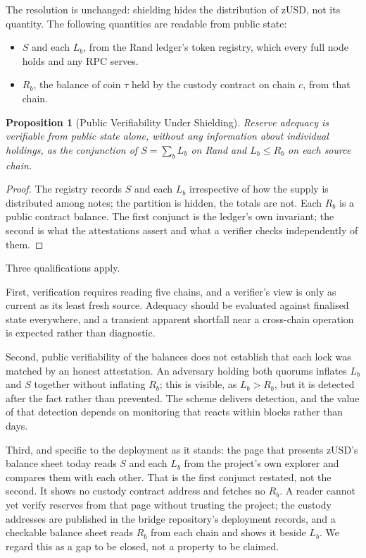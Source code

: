 \documentclass[11pt,a4paper]{article}
\newtheorem{proposition}[theorem]{Proposition}
\begin{document}
The resolution is unchanged: shielding hides the distribution of zUSD, not its quantity. The following quantities are readable from public state:

\begin{itemize}
    \item $S$ and each $L_b$, from the Rand ledger's token registry, which every full node holds and any RPC serves.
    \item $R_b$, the balance of coin $\tau$ held by the custody contract on chain $c$, from that chain.
\end{itemize}

\begin{proposition}[Public Verifiability Under Shielding]
\label{prop:verif}
Reserve adequacy is verifiable from public state alone, without any information about individual holdings, as the conjunction of $S = \sum_b L_b$ on Rand and $L_b \leq R_b$ on each source chain.
\end{proposition}

\begin{proof}
The registry records $S$ and each $L_b$ irrespective of how the supply is distributed among notes; the partition is hidden, the totals are not. Each $R_b$ is a public contract balance. The first conjunct is the ledger's own invariant; the second is what the attestations assert and what a verifier checks independently of them.
\end{proof}

Three qualifications apply.

First, verification requires reading five chains, and a verifier's view is only as current as its least fresh source. Adequacy should be evaluated against finalised state everywhere, and a transient apparent shortfall near a cross-chain operation is expected rather than diagnostic.

Second, public verifiability of the balances does not establish that each lock was matched by an honest attestation. An adversary holding both quorums inflates $L_b$ and $S$ together without inflating $R_b$; this is visible, as $L_b > R_b$, but it is detected after the fact rather than prevented. The scheme delivers detection, and the value of that detection depends on monitoring that reacts within blocks rather than days.

Third, and specific to the deployment as it stands: the page that presents zUSD's balance sheet today reads $S$ and each $L_b$ from the project's own explorer and compares them with each other. That is the first conjunct restated, not the second. It shows no custody contract address and fetches no $R_b$. A reader cannot yet verify reserves from that page without trusting the project; the custody addresses are published in the bridge repository's deployment records, and a checkable balance sheet reads $R_b$ from each chain and shows it beside $L_b$. We regard this as a gap to be closed, not a property to be claimed.
\end{document}
